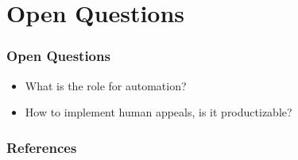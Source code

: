 \documentclass[11pt,
               aspectratio=169,
               hyperref={colorlinks}
               ]{beamer}
\begin{document}
	\section{Open Questions}

		\begin{frame}

			\frametitle{Open Questions}		

			\begin{itemize}
				\item What is the role for automation?
				\item How to implement human appeals, is it productizable?
			\end{itemize}
			
		\end{frame}



	\begin{frame}[t, allowframebreaks]
	
		\frametitle{References}
		
		\printbibliography
		
	\end{frame}
\end{document}

